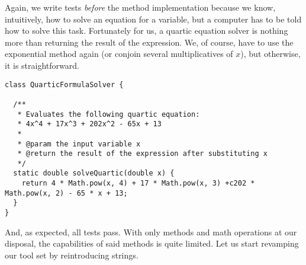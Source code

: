 Again, we write tests \textit{before} the method implementation because we know, intuitively, how to solve an equation for a variable, but a computer has to be told how to solve this task. Fortunately for us, a quartic equation solver is nothing more than returning the result of the expression. We, of course, have to use the exponential  method again (or conjoin several multiplicatives of $x$), but otherwise, it is straightforward.

\begin{cl}{}
\begin{lstlisting}[language=MyJava]
class QuarticFormulaSolver {

  /**
   * Evaluates the following quartic equation:
   * 4x^4 + 17x^3 + 202x^2 - 65x + 13
   *
   * @param the input variable x
   * @return the result of the expression after substituting x
   */
  static double solveQuartic(double x) {
    return 4 * Math.pow(x, 4) + 17 * Math.pow(x, 3) +c202 * Math.pow(x, 2) - 65 * x + 13;
  }
}
\end{lstlisting}
\end{cl}

And, as expected, all tests pass. With only methods and math operations at our disposal, the capabilities of said methods is quite limited. Let us start revamping our tool set by reintroducing strings.